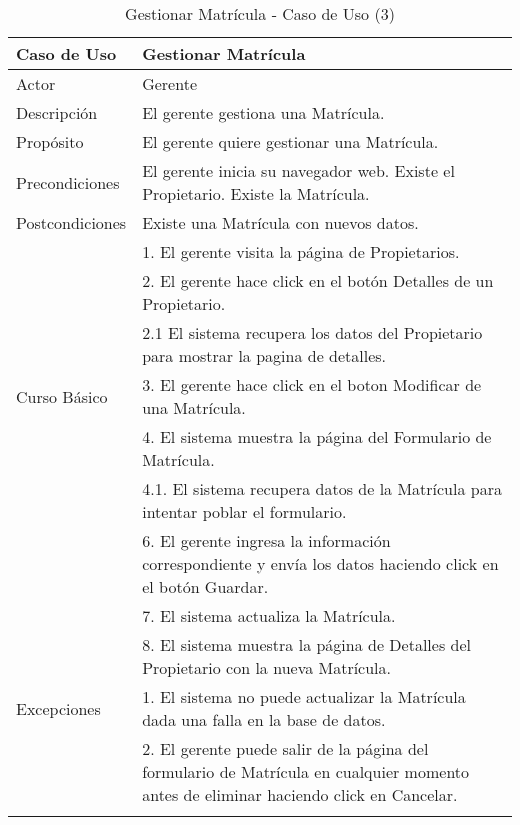\begin{longtable}{@{} p{3cm} p{10cm} @{}} \toprule
    \textbf{Caso de Uso}    & Gestionar Matrícula \\ \midrule
    Actor                   & Gerente \\ \cmidrule{1-2}
    Descripción             & El gerente gestiona una Matrícula. \\ \cmidrule{1-2}
    Propósito               & El gerente quiere gestionar una Matrícula. \\ \cmidrule{1-2}
    Precondiciones          & El gerente inicia su navegador web. Existe el Propietario. Existe la Matrícula. \\ \cmidrule{1-2} 
    Postcondiciones         & Existe una Matrícula con nuevos datos. \\ \cmidrule{1-2} 
                            & 1. El gerente visita la página de Propietarios. \\ 
                            & 2. El gerente hace click en el botón Detalles de un Propietario. \\
                            & 2.1 El sistema recupera los datos del Propietario para mostrar la pagina de detalles. \\
    Curso Básico            & 3. El gerente hace click en el boton Modificar de una Matrícula. \\
                            & 4. El sistema muestra la página del Formulario de Matrícula. \\
                            & 4.1. El sistema recupera datos de la Matrícula para intentar poblar el formulario. \\
                            & 6. El gerente ingresa la información correspondiente y envía los datos haciendo click en el botón Guardar. \\ 
                            & 7. El sistema actualiza la Matrícula. \\ 
                            & 8. El sistema muestra la página de Detalles del Propietario con la nueva Matrícula. \\ \cmidrule{1-2}
    Excepciones             & 1. El sistema no puede actualizar la Matrícula dada una falla en la base de datos. \\
                            & 2. El gerente puede salir de la página del formulario de Matrícula en cualquier momento antes de eliminar haciendo click en Cancelar. \\ \bottomrule
   \caption{Gestionar Matrícula - Caso de Uso (3)} \label{tab:tabcu-matri2} \\
   \end{longtable}

